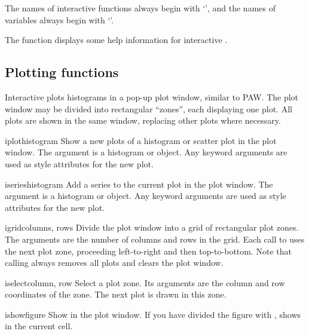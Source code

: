 The names of interactive \pyhep functions always begin with `',
and the names of variables always begin with `'.

The  function displays some help information for
interactive \pyhep.


\subsection{Plotting functions}

Interactive \pyhep plots histograms in a pop-up plot window, similar to
PAW.  The plot window may be divided into rectangular ``zones'', each
displaying one plot.  All plots are shown in the same window, replacing
other plots where necessary.

\begin{funcdesc}{iplot}{histogram}
 Show a new plots of a histogram or scatter plot in the plot window.
 The argument is a histogram or  object.  Any keyword
 arguments are used as style attributes for the new plot.
\end{funcdesc}

\begin{funcdesc}{iseries}{histogram}
 Add a series to the current plot in the plot window.  The argument is a
 histogram or  object.  Any keyword arguments are used as
 style attributes for the new plot.
\end{funcdesc}

\begin{funcdesc}{igrid}{columns, rows}
 Divide the plot window into a grid of rectangular plot zones.  The
 arguments are the number of columns and rows in the grid.  Each call to
  uses the next plot zone, proceeding left-to-right and
 then top-to-bottom.  Note that calling  always
 removes all plots and clears the plot window.
\end{funcdesc}

\begin{funcdesc}{iselect}{column, row}
 Select a plot zone.  Its arguments are the column and row coordinates
 of the zone.  The next plot is drawn in this zone. 
\end{funcdesc}

\begin{funcdesc}{ishow}{figure}
 Show  in the plot window.  If you have divided the figure
 with , shows  in the current cell.
\end{funcdesc}

